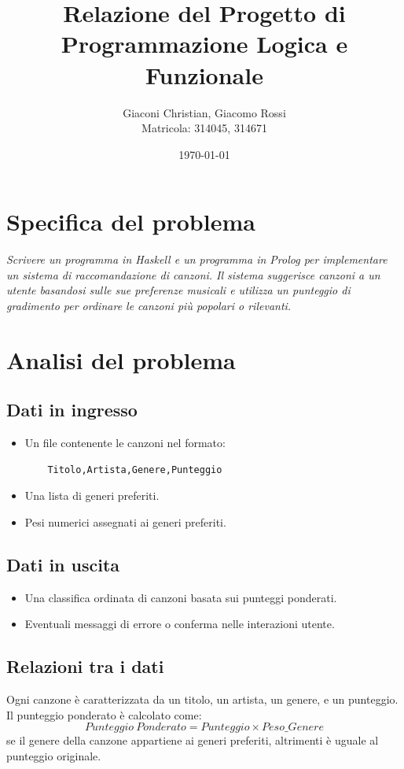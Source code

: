 \documentclass[a4paper,11pt]{article}
\title{\textbf{Relazione del Progetto di Programmazione Logica e Funzionale}}
\author{Giaconi Christian, Giacomo Rossi\\Matricola: 314045, 314671}
\date{\today}
\begin{document}
\maketitle

\newpage
\tableofcontents

\newpage
\section{Specifica del problema}
\itshape
Scrivere un programma in Haskell e un programma in Prolog per implementare un sistema di raccomandazione di canzoni. Il sistema suggerisce canzoni a un utente basandosi sulle sue preferenze musicali e utilizza un punteggio di gradimento per ordinare le canzoni più popolari o rilevanti.

\newpage
\section{Analisi del problema}
\subsection{Dati in ingresso}
\begin{itemize}
    \item Un file contenente le canzoni nel formato:
    \begin{verbatim}
    Titolo,Artista,Genere,Punteggio
    \end{verbatim}
    \item Una lista di generi preferiti.
    \item Pesi numerici assegnati ai generi preferiti.
\end{itemize}

\subsection{Dati in uscita}
\begin{itemize}
    \item Una classifica ordinata di canzoni basata sui punteggi ponderati.
    \item Eventuali messaggi di errore o conferma nelle interazioni utente.
\end{itemize}

\subsection{Relazioni tra i dati}
Ogni canzone è caratterizzata da un titolo, un artista, un genere, e un punteggio. Il punteggio ponderato è calcolato come:
\[
Punteggio\ Ponderato = Punteggio \times Peso\_{Genere}
\]
se il genere della canzone appartiene ai generi preferiti, altrimenti è uguale al punteggio originale.
\end{document}
